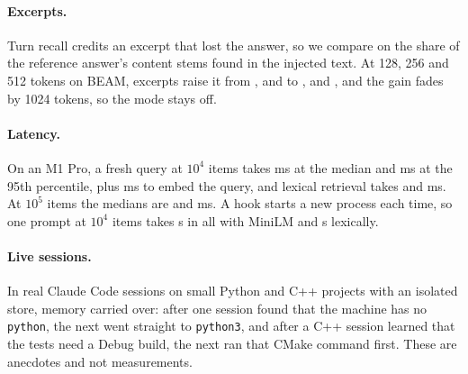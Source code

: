\paragraph{Excerpts.} Turn recall credits an excerpt that lost the answer, so we compare on the share of the reference answer's content stems found in the injected text. At 128, 256 and 512 tokens on BEAM, excerpts raise it from ,  and  to ,  and , and the gain fades by 1024 tokens, so the mode stays off.

\begin{table}[!htb]\centering\scriptsize
\caption{Reversible consolidation (LongMemEval-S: 60 random questions). $\tau$ is the similarity threshold, $R$ the extractive rate.}\label{tab:consolidation}
\resizebox{\columnwidth}{!}{}
\end{table}

\begin{table}[!htb]\centering\scriptsize
\caption{Forgetting on RepoMem streams: final active store and recall.}\label{tab:forgetting}
\resizebox{\columnwidth}{!}{}
\end{table}

\paragraph{Latency.} On an M1 Pro, a fresh query at $10^4$ items takes  ms at the median and  ms at the 95th percentile, plus  ms to embed the query, and lexical retrieval takes  and  ms. At $10^5$ items the medians are  and  ms. A hook starts a new process each time, so one prompt at $10^4$ items takes  s in all with MiniLM and  s lexically.

\paragraph{Live sessions.} In real Claude Code sessions on small Python and C++ projects with an isolated store, memory carried over: after one session found that the machine has no \texttt{python}, the next went straight to \texttt{python3}, and after a C++ session learned that the tests need a Debug build, the next ran that CMake command first. These are anecdotes and not measurements.

